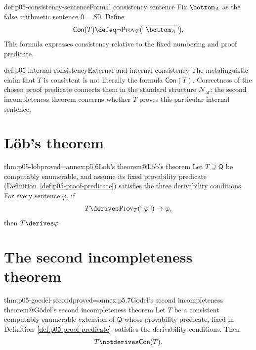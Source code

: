\begin{hbdefinition}{def:p05-consistency-sentence}{Formal consistency sentence}
Fix \(\bottom_A\) as the false arithmetic sentence \(0=S0\).  Define
\[
  \mathsf{Con}(T)\defeq
  \neg\mathrm{Prov}_T(\overline{\ulcorner\bottom_A\urcorner}).
\]
This formula expresses consistency relative to the fixed numbering and
proof predicate.
\end{hbdefinition}

\begin{hbwarning}{def:p05-internal-consistency}{External and internal consistency}
The metalinguistic claim that \(T\) is consistent is not literally the
formula \(\mathsf{Con}(T)\).  Correctness of the chosen proof predicate
connects them in the standard structure \(\mathcal N_{\mathrm{ar}}\); the second
incompleteness theorem concerns whether \(T\) proves this particular
internal sentence.
\end{hbwarning}

\section{L\"ob's theorem}
\label{sec:p05-provability-truth-02}

\begin{hbtheorem}{thm:p05-lob}{proved=annex:p5.6}{Lob's theorem@L\"ob's theorem}
Let \(T\supseteq\mathsf Q\) be computably enumerable, and assume its
fixed provability predicate (Definition~\ref{def:p05-proof-predicate})
satisfies the three derivability conditions.  For every sentence
\(\varphi\), if
\[
  T\derives
  \mathrm{Prov}_T(\ulcorner\varphi\urcorner)\to\varphi,
\]
then \(T\derives\varphi\).
\end{hbtheorem}

\section{The second incompleteness theorem}
\label{sec:p05-provability-truth-03}

\begin{hbtheorem}{thm:p05-goedel-second}{proved=annex:p5.7}{Godel's second incompleteness theorem@G\"odel's second incompleteness theorem}
Let \(T\) be a consistent computably enumerable extension of
\(\mathsf Q\) whose provability predicate, fixed in
Definition~\ref{def:p05-proof-predicate}, satisfies the derivability
conditions.  Then
\[
  T\notderives\mathsf{Con}(T).
\]
\end{hbtheorem}

